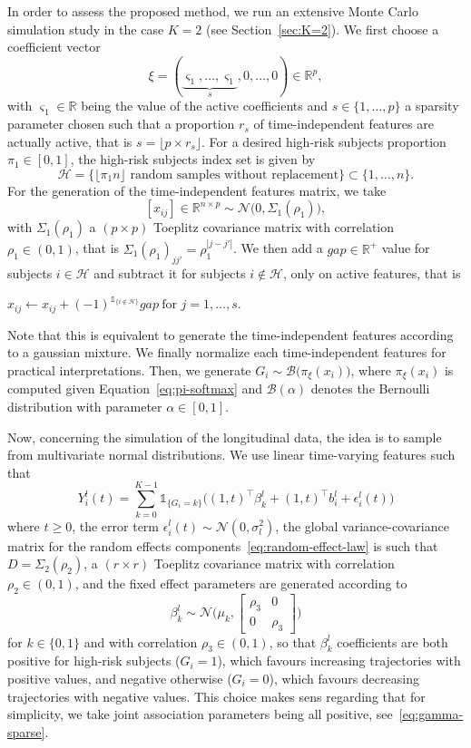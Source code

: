 \documentclass[11pt]{article}
\newcommand{\ind}[1]{\mathds{1}_{#1}}
\newcommand{\cN}{\mathcal N}
\newcommand{\cH}{\mathcal H}
\newcommand{\cB}{\mathcal B}
\newcommand{\R}{\mathds R}
\newcommand{\bSigma}{\textbf{$\Sigma$}}
\begin{document}
In order to assess the proposed method, we run an extensive Monte Carlo simulation study in the case $K=2$ (see Section~\ref{sec:K=2}). We first choose a coefficient vector 
\begin{equation}
  \label{eq:xi-sparse}
  \xi = (\underbrace{\varsigma_1,\ldots,\varsigma_1}_s,0,\ldots,0) \in \R^p,
\end{equation} 
with $\varsigma_1\in\R$ being the value of the active coefficients and $s\in \{1,\dots,p\}$ a sparsity parameter chosen such that a proportion $r_s$ of time-independent features are actually active, that is $s = \lfloor p \times r_s \rfloor$. 
For a desired high-risk subjects proportion $\pi_1 \in [0,1]$, the high-risk subjects index set is given by
\[\cH = \big\{\lfloor \pi_1 n \rfloor \text{ random samples without replacement} \big\} \subset \{1, \ldots,n\}.\]
For the generation of the time-independent features matrix, we take 
\[ [x_{ij}] \in \R^{n \times p} \sim \cN \big(0, \bSigma_1(\rho_1)\big),\] 
with $\bSigma_1(\rho_1)$ a $(p \times p)$ Toeplitz covariance matrix \citep{mukherjee1988some} with correlation $\rho_1 \in (0, 1)$, that is $\bSigma_1(\rho_1)_{jj'} = \rho_1^{|j - j'|}$. 
We then add a $gap \in \R^+$ value for subjects $i \in \cH$ and subtract it for subjects $i \notin \cH$, only on active features, that is
\begin{center}
$x_{ij} \leftarrow x_{ij} + (-1)^{\ind{\{i \notin \cH\}}} gap\ \text{for } j = 1, \dots, s$.
\end{center}
Note that this is equivalent to generate the time-independent features according to a gaussian mixture. We finally normalize each time-independent features for practical interpretations.
Then, we generate $G_i \sim \cB\big(\pi_\xi(x_i)\big)$, where $\pi_\xi(x_i)$ is computed given Equation~\eqref{eq:pi-softmax} and $\cB(\alpha)$ denotes the Bernoulli distribution with parameter $\alpha \in [0,1]$.

Now, concerning the simulation of the longitudinal data, the idea is to sample from multivariate normal distributions. 
We use linear time-varying features such that
\[ Y_i^l(t) = \sum_{k=0}^{K-1} \ind{\{G_i=k\}} \big( (1, t)^\top \beta_k^l + (1, t)^\top b_i^l + \epsilon_i^l(t) \big) \]
where $t \geq 0$, the error term $\epsilon_i^l(t) \sim \cN(0, \sigma_l^2)$, the global variance-covariance matrix for the random effects components~\eqref{eq:random-effect-law} is such that $D = \bSigma_2(\rho_2)$, a $(r \times r)$ Toeplitz covariance matrix with correlation $\rho_2 \in (0, 1)$, and the fixed effect parameters are generated according to 
\[ \beta_k^l \sim \cN\Big( 
\mu_k, 
\begin{bmatrix}
  \rho_3 & 0\\
  0 & \rho_3
\end{bmatrix} 
\Big) \]
for $k \in \{0, 1\}$ and with correlation $\rho_3 \in (0, 1)$, so that $\beta_k^l$ coefficients are both positive for high-risk subjects ($G_i=1$), which favours increasing trajectories with positive values, and negative otherwise ($G_i=0$), which favours decreasing trajectories with negative values. This choice makes sens regarding that for simplicity, we take joint association parameters being all positive, see~\eqref{eq:gamma-sparse}.
\end{document}
